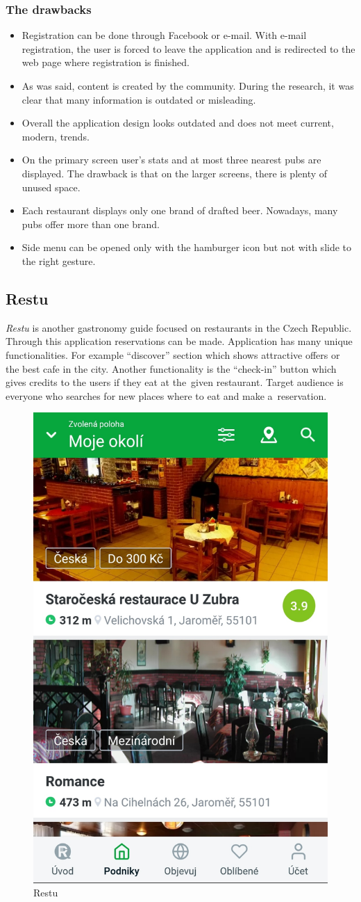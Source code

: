 \subsubsection{The drawbacks}
\begin{itemize}
    \item Registration can be done through Facebook or e-mail. With e-mail registration, the user is forced to leave the application and is redirected to the web page where registration is finished.
    \item As was said, content is created by the community. During the research, it was clear that many information is outdated or misleading. 
    \item Overall the application design looks outdated and does not meet current, modern,  trends.
    \item On the primary screen user's stats and at most three nearest pubs are displayed. The drawback is that on the larger screens, there is plenty of unused space. 
    \item Each restaurant displays only one brand of drafted beer. Nowadays, many pubs offer more than one brand. 
    \item Side menu can be opened only with the hamburger icon but not with slide to the right gesture.
\end{itemize}

\subsection{Restu}
\textit{Restu} is another gastronomy guide focused on restaurants in the Czech Republic. Through this application reservations can be made. Application has many unique functionalities. For example ``discover'' section which shows attractive offers or the best cafe in the city. Another functionality is the ``check-in'' button which gives credits to the users if they eat at the~given restaurant. Target audience is everyone who searches for new places where to eat and make a~reservation.

\begin{figure}[ht]
    \centering
    \includegraphics[width=0.33\linewidth]{img/analysis/restu.jpg}
    \caption{Restu \cite{app-restu}}
    \label{fig:restu}
\end{figure}

